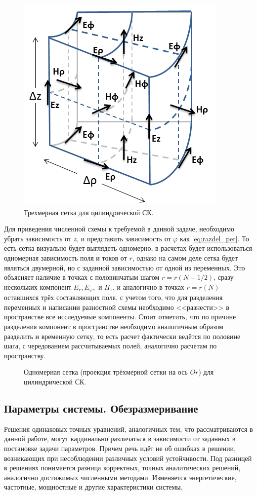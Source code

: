 \documentclass[a4paper]{article}
\begin{document}
\begin{figure}[H]\centering	
	\includegraphics[width=0.5\linewidth]{pics/FDTD_cill}
	\caption{Трехмерная сетка для цилиндрической СК.}
	\label{fig:fdtd_3d}
\end{figure}

Для приведения численной схемы к требуемой в данной задаче, необходимо убрать зависимость от $z$, и представить зависимость от $\varphi$ как \eqref{eq:razdel_per}. То есть сетка визуально будет выглядеть одномерно, в расчетах будет использоваться одномерная зависимость поля и токов от $r$, однако на самом деле сетка будет являться двумерной, но с заданной зависимостью от одной из переменных. Это объясняет наличие в точках с половинчатым шагом $r=r\left(N+1/2\right)$, сразу нескольких компонент $E_{r}, E_{\varphi}, \text{ и } H_{z}$, и аналогично в точках $r=r\left(N\right)$ оставшихся трёх составляющих поля, с учетом того, что для разделения переменных и написании разностной схемы необходимо <<разнести>> в пространстве все исследуемые компоненты. Стоит отметить, что по причине разделения компонент в пространстве необходимо аналогичным образом разделить и временную сетку, то есть расчет фактически ведётся по половине шага, с чередованием рассчитываемых полей, аналогично расчетам по пространству.
\begin{figure}[H]\centering
	
	\caption{Одномерная сетка (проекция трёхмерной сетки на ось $Or$) для цилиндрической СК.}
	\label{fig:fdtd_1d}
\end{figure}

\subsection{Параметры системы. Обезразмеривание}

Решения одинаковых точных уравнений, аналогичных тем, что рассматриваются в данной работе, могут кардинально различаться в зависимости от заданных в постановке задачи параметров. Причем речь идёт не об ошибках в решении, возникающих при несоблюдении различных условий устойчивости. Под разницей в  решениях понимается разница корректных, точных аналитических решений, аналогично достижимых численными методами. Изменяется энергетические, частотные, мощностные и другие характеристики системы.
\end{document}
